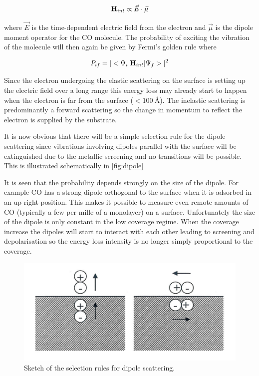 \begin{equation}
{\bf H}_{int}\propto \vec{E}\cdot\vec{\mu}
\end{equation}
 
\noindent where $\vec{E}$ is the time-dependent electric field from the electron and $\vec{\mu}$ is the dipole moment operator for the CO molecule. The probability of exciting the vibration of the molecule will then again be given by Fermi's golden rule where

\begin{equation}
P_{if}=\vert <\Psi_i\vert{\bf H}_{int}\vert\Psi_f>\vert^2
\end{equation}

Since the electron undergoing the elastic scattering on the surface is setting up the electric field over a long range this energy loss may already start to happen when the electron is far from the surface ($<\SI{100}{\angstrom}$). The inelastic scattering is predominantly a forward scattering so the change in momentum to reflect the electron is supplied by the substrate.

It is now obvious that there will be a simple selection rule for the dipole scattering since vibrations involving dipoles parallel with the surface will be extinguished due to the metallic screening and no transitions will be possible. This is illustrated schematically in \autoref{fig:dipole}

It is seen that the probability depends strongly on the size of the dipole. For example CO has a strong dipole orthogonal to the surface when it is adsorbed in an up right position. This makes it possible to measure  even remote amounts of CO (typically a few per mille of a monolayer) on a surface. Unfortunately the size of the dipole is only constant in the low coverage regime. When the coverage increase the dipoles will start to interact with each other leading to screening and depolarisation so the energy loss intensity is no longer simply  proportional to the coverage. 

\begin{figure}[h!]
	\begin{center}
	\includegraphics[scale=3]{figures/08_03.png}
	\caption{Sketch of the selection rules for dipole scattering.}
	\label{fig:dipole}
	\end{center}
\end{figure}

